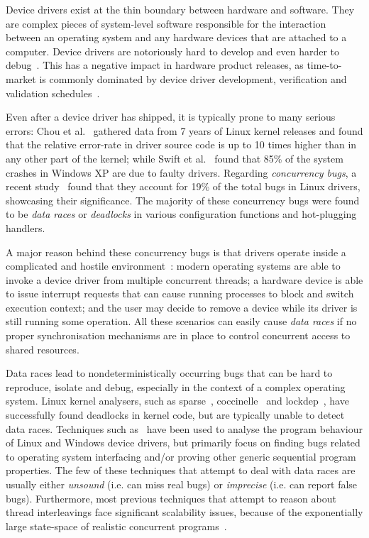 Device drivers exist at the thin boundary between hardware and software. They are complex pieces of system-level software responsible for the interaction between an operating system and any hardware devices that are attached to a computer. Device drivers are notoriously hard to develop and even harder to debug~\cite{corbet2005linux}. This has a negative impact in hardware product releases, as time-to-market is commonly dominated by device driver development, verification and validation schedules~\cite{yavatkar2012era}.

Even after a device driver has shipped, it is typically prone to many serious errors: Chou et al.~\cite{chou2001empirical} gathered data from 7 years of Linux kernel releases and found that the relative error-rate in driver source code is up to 10 times higher than in any other part of the kernel; while Swift et al.~\cite{Swift2003windowsxp} found that 85\% of the system crashes in Windows XP are due to faulty drivers. Regarding \emph{concurrency bugs}, a recent study~\cite{ryzhyk2009dingo} found that they account for 19\% of the total bugs in Linux drivers, showcasing their significance. The majority of these concurrency bugs were found to be \emph{data races} or \emph{deadlocks} in various configuration functions and hot-plugging handlers.

A major reason behind these concurrency bugs is that drivers operate inside a complicated and hostile environment~\cite{corbet2005linux}: modern operating systems are able to invoke a device driver from multiple concurrent threads; a hardware device is able to issue interrupt requests that can cause running processes to block and switch execution context; and the user may decide to remove a device while its driver is still running some operation. All these scenarios can easily cause \emph{data races} if no proper synchronisation mechanisms are in place to control concurrent access to shared resources.

Data races lead to nondeterministically occurring bugs that can be hard to reproduce, isolate and debug, especially in the context of a complex operating system. Linux kernel analysers, such as sparse~\cite{corbet2004sparse}, coccinelle~\cite{padioleau2008doc} and lockdep~\cite{corbet2006lock}, have successfully found deadlocks in kernel code, but are typically unable to detect data races. Techniques such as~\cite{ball2006thorough, clarke2004predicate, qadeer2004kiss, engler2000checking, henzinger2002temporal, cook2006termination, pratikakis2006locksmith, kuznetsov2010testing, renzelmann2012symdrive, lal2012corral} have been used to analyse the program behaviour of Linux and Windows device drivers, but primarily focus on finding bugs related to operating system interfacing and/or proving other generic sequential program properties. The few of these techniques that attempt to deal with data races are usually either \emph{unsound} (i.e. can miss real bugs) or \emph{imprecise} (i.e. can report false bugs). Furthermore, most previous techniques that attempt to reason about thread interleavings face significant scalability issues, because of the exponentially large state-space of realistic concurrent programs~\cite{musuvathi2008finding}.

